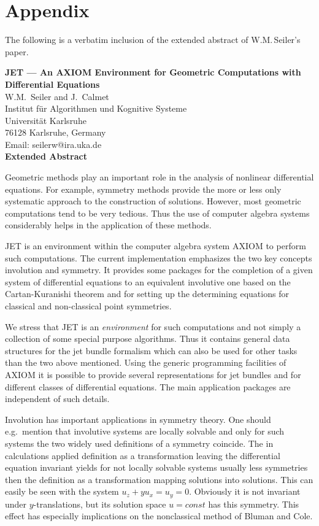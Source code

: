 \documentclass[12pt,a4paper]{article}
\begin{document}
\section{Appendix}
The following is a verbatim inclusion of the extended abstract of
W.M.\,Seiler's paper.

\begin{center}
{\bf JET --- An AXIOM Environment for Geometric Computations with
Differential Equations} \\
{ W.M.~Seiler and J.~Calmet\\
        Institut f\"ur Algorithmen und Kognitive Systeme\\
        Universit\"at Karlsruhe\\
        76128 Karlsruhe, Germany\\
        Email: seilerw@ira.uka.de} \\
\bf Extended Abstract
\end{center}

Geometric methods play an important role in the analysis of nonlinear
differential equations. For example, symmetry methods provide the more or less
only systematic approach to the construction of solutions. However, most
geometric computations tend to be very tedious. Thus the use of computer algebra
systems considerably helps in the application of these methods.

{\small JET} is an environment within the computer algebra system {\small AXIOM}
to perform such computations. The current implementation emphasizes the two key
concepts involution and symmetry. It provides some packages for the completion
of a given system of differential equations to an equivalent involutive one
based on the Cartan-Kuranishi theorem and for setting up the determining
equations for classical and non-classical point symmetries.

We stress that {\small JET} is an {\em environment\/} for such computations and
not simply a collection of some special purpose algorithms. Thus it contains
general data structures for the jet bundle formalism which can also be used for
other tasks than the two above mentioned. Using the generic programming
facilities of {\small AXIOM} it is possible to provide several representations
for jet bundles and for different classes of differential equations. The main
application packages are independent of such details.

Involution has important applications in symmetry theory. One should e.g.\
mention that involutive systems are locally solvable and only for such systems
the two widely used definitions of a symmetry coincide. The in calculations
applied definition as a transformation leaving the differential equation
invariant yields for not locally solvable systems usually less symmetries then
the definition as a transformation mapping solutions into solutions.  This can
easily be seen with the system $u_{z}+yu_{x}=u_{y}=0$. Obviously it is not
invariant under $y$-translations, but its solution space $u=const$ has this
symmetry. This effect has especially implications on the nonclassical method of
Bluman and Cole.
\end{document}
